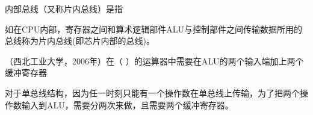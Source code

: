 \question 内部总线（又称片内总线）是指
\par{}
\begin{solution}如在CPU内部，寄存器之间和算术逻辑部件ALU与控制部件之间传输数据所用的总线称为片内总线(即芯片内部的总线)。
\end{solution}
\question （西北工业大学，2006年）在（
）的运算器中需要在ALU的两个输入端加上两个缓冲寄存器
\par{}
\begin{solution}对于单总线结构，因为任一时刻只能有一个操作数在单总线上传输，为了把两个操作数输入到ALU，需要分两次来做，且需要两个缓冲寄存器。
\end{solution}

